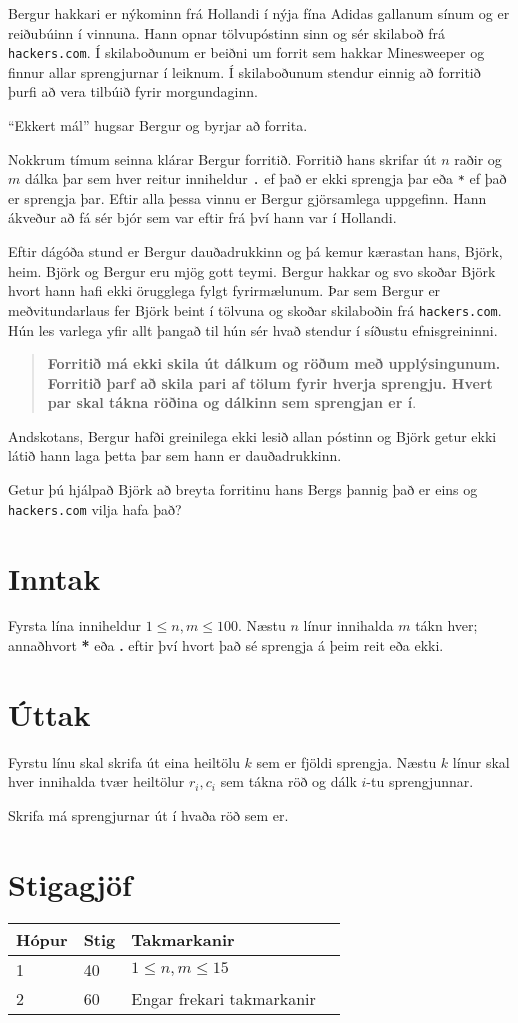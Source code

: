 
Bergur hakkari er nýkominn frá Hollandi í nýja fína Adidas gallanum sínum og er reiðubúinn í vinnuna.
Hann opnar tölvupóstinn sinn og sér skilaboð frá \texttt{hackers.com}.
Í skilaboðunum er beiðni um forrit sem hakkar Minesweeper og finnur allar sprengjurnar í leiknum.
Í skilaboðunum stendur einnig að forritið þurfi að vera tilbúið fyrir morgundaginn.

``Ekkert mál'' hugsar Bergur og byrjar að forrita.

Nokkrum tímum seinna klárar Bergur forritið.
Forritið hans skrifar út $n$ raðir og $m$ dálka þar sem hver reitur inniheldur \texttt{.}
ef það er ekki sprengja þar eða \texttt{*} ef það er sprengja þar.
Eftir alla þessa vinnu er Bergur gjörsamlega uppgefinn. Hann ákveður að fá sér bjór
sem var eftir frá því hann var í Hollandi.

Eftir dágóða stund er Bergur dauðadrukkinn og þá kemur kærastan hans, Björk, heim.
Björk og Bergur eru mjög gott teymi.
Bergur hakkar og svo skoðar Björk hvort hann hafi ekki örugglega fylgt fyrirmælunum.
Þar sem Bergur er meðvitundarlaus fer Björk beint í tölvuna og skoðar skilaboðin frá \texttt{hackers.com}.
Hún les varlega yfir allt þangað til hún sér hvað stendur í síðustu efnisgreininni.
\begin{quote}
    \textbf{Forritið má ekki skila út dálkum og röðum með upplýsingunum. Forritið þarf að skila
    pari af tölum fyrir hverja sprengju. Hvert par skal tákna röðina og dálkinn sem sprengjan er í}.
\end{quote}

Andskotans, Bergur hafði greinilega ekki lesið allan póstinn og Björk getur ekki látið hann laga þetta þar sem hann er dauðadrukkinn.

Getur þú hjálpað Björk að breyta forritinu hans Bergs þannig það er eins og \texttt{hackers.com} vilja hafa það?

\section*{Inntak}
Fyrsta lína inniheldur $1 \le n,m \le 100$.
Næstu $n$ línur innihalda $m$ tákn hver; annaðhvort \textbf{*} eða \textbf{.}
eftir því hvort það sé sprengja á þeim reit eða ekki.

\section*{Úttak}
Fyrstu línu skal skrifa út eina heiltölu $k$ sem er fjöldi sprengja.
Næstu $k$ línur skal hver innihalda tvær heiltölur $r_i, c_i$ sem tákna röð og dálk $i$-tu sprengjunnar.

Skrifa má sprengjurnar út í hvaða röð sem er.

\section*{Stigagjöf}
\begin{tabular}{|l|l|l|l|}
\hline
Hópur & Stig & Takmarkanir \\ \hline
1     & 40    & $1 \le n,m \le 15$ \\ \hline
2     & 60    & Engar frekari takmarkanir \\ \hline
\end{tabular}
